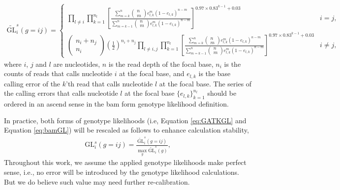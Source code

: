 \documentclass{article}
\begin{document}
 \begin{align}
 \widetilde{\mathrm{GL}}_i^s(g=ij)=\left\{\begin{array}{cc}
      \prod\limits_{l\neq i}\prod\limits_{k=1}^{n_l}\left[\frac{\sum\limits_{m=k}^n\left(\begin{array}{c}
           n  \\
           m 
      \end{array}\right)e_{l,k}^m(1-e_{l,k})^{n-m}}{\sum\limits_{m=k-1}^n\left(\begin{array}{c}
           n  \\
           m 
      \end{array}\right)e_{l,k}^m(1-e_{l,k})^{n-m}}\right]^{0.97\times 0.83^{k-1}+0.03} & i=j,  \\
      \left(\begin{array}{c}
           n_i+n_j  \\
           n_i
      \end{array}\right)\left(\frac{1}{2}\right)^{n_i+n_j}\prod\limits_{l\neq i,j}\prod\limits_{k=1}^{n_l}\left[\frac{\sum\limits_{m=k}^n\left(\begin{array}{c}
           n  \\
           m 
      \end{array}\right)e_{l,k}^m(1-e_{l,k})^{n-m}}{\sum\limits_{m=k-1}^n\left(\begin{array}{c}
           n  \\
           m 
      \end{array}\right)e_{l,k}^m(1-e_{l,k})^{n-m}}\right]^{0.97\times 0.83^{k-1}+0.03}& i\neq j, 
 \end{array}\right. \label{eq:bamGL}
 \end{align}
 where $i$, $j$ and $l$ are nucleotides, $n$ is the read depth of the focal base, $n_i$ is the counts of reads that calls nucleotide $i$ at the focal base, and $e_{l,k}$ is the base calling error of the $k$'th read that calls nucleotide $l$ at the focal base. The series of the calling errors that calls nucleotide $l$ at the focal base $\{e_{l,k}\}_{k=1}^{n_l}$ should be ordered in an ascend sense in the bam form genotype likelihood definition.
 
In practice, both forms of genotype likelihoods (i.e, Equation \ref{eq:GATKGL} and Equation \ref{eq:bamGL}) will be rescaled as follows to enhance calculation stability,
\begin{align*}
\mathrm{GL}_i^s(g=ij) = \frac{\widetilde{\mathrm{GL}}_i^s(g=ij)}{\max_{g}\widetilde{\mathrm{GL}}_i^s(g)},
\end{align*}
Throughout this work, we assume the applied genotype likelihoods make perfect sense, i.e., no error will be introduced by the genotype likelihood calculations. But we do believe such value may need further re-calibration.
\end{document}
